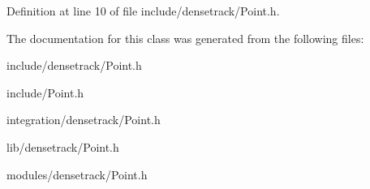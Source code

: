 Definition at line 10 of file include/densetrack/Point.h.



The documentation for this class was generated from the following files:\begin{DoxyCompactItemize}
\item 
include/densetrack/Point.h\item 
include/Point.h\item 
integration/densetrack/Point.h\item 
lib/densetrack/Point.h\item 
modules/densetrack/Point.h\end{DoxyCompactItemize}
